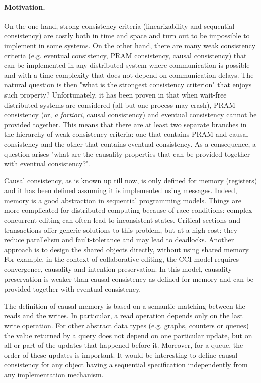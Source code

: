 \documentclass[9pt,numbers]{sigplanconf}
\begin{document}
\paragraph{Motivation.}

On the one hand, strong consistency criteria (linearizability and sequential consistency) are 
costly both in time and space and turn out to be impossible to implement in some systems. On the other 
hand, there are many weak consistency criteria (e.g. eventual consistency, PRAM consistency, causal 
consistency) that can be implemented in any distributed system where communication is possible 
and with a time complexity that does not depend on communication delays. The natural question is 
then "what is the strongest consistency criterion" that enjoys such property? Unfortunately, 
it has been proven in \cite{perrin2015update} that when wait-free distributed systems are 
considered (all but one process may crash), PRAM consistency (or, \textit{a fortiori}, causal 
consistency) and eventual consistency cannot be provided together.
This means that there are at least two separate branches in the hierarchy of weak consistency criteria: 
one that contains PRAM and causal consistency and the other that contains eventual consistency. As a 
consequence, a question arises "what are the causality properties that can be provided together with 
eventual consistency?". 

Causal consistency, as is known up till now, is only defined for memory (registers) and it has been defined 
assuming it is implemented using messages. Indeed, memory is a good abstraction in sequential programming 
models. Things are more complicated for distributed computing because of race conditions: complex 
concurrent editing can often lead to inconsistent states. Critical sections and transactions offer 
generic solutions to this problem, but at a high cost: they reduce parallelism and fault-tolerance and 
may lead to deadlocks. Another approach is to design the shared objects directly, without using shared 
memory. For example, in the context of collaborative editing, the CCI model \cite{sun1998achieving} 
requires convergence, causality and intention preservation. In this model, causality preservation is 
weaker than causal consistency as defined for memory and can be provided together with eventual consistency.

The definition of causal memory is based on a semantic matching between the reads and the writes. 
In particular, a read operation depends only on the last write operation. For other abstract data 
types (e.g. graphs, counters or queues) the value returned by a query does not depend on one particular 
update, but on all or part of the updates that happened before it. Moreover, for a queue, the order 
of these updates is important. It would be interesting to define causal consistency for any object 
having a sequential specification independently from any implementation mechanism.
\end{document}
